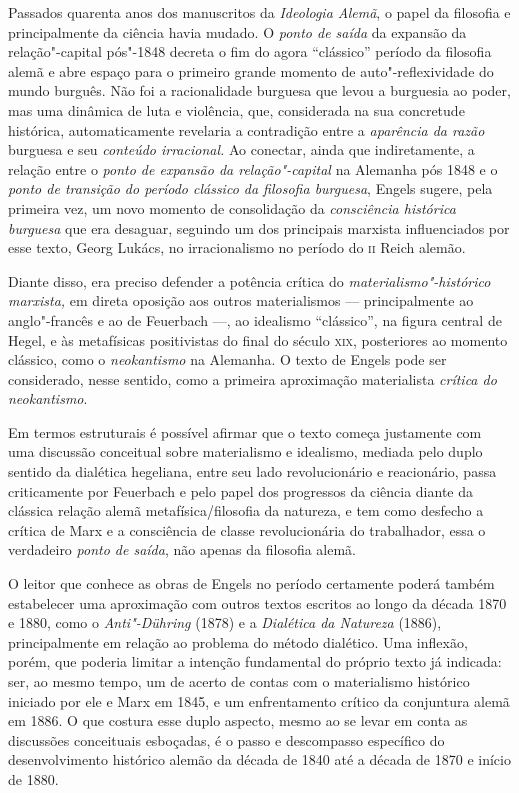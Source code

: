 Passados quarenta anos dos manuscritos da \emph{Ideologia Alemã}, o
papel da filosofia e principalmente da ciência havia mudado. O
\emph{ponto de saída} da expansão da relação"-capital pós"-1848 decreta o
fim do agora ``clássico'' período da filosofia alemã e abre espaço para
o primeiro grande momento de auto"-reflexividade do mundo burguês. Não
foi a racionalidade burguesa que levou a burguesia ao poder, mas uma
dinâmica de luta e violência, que, considerada na sua concretude
histórica, automaticamente revelaria a contradição entre a
\emph{aparência da razão} burguesa e seu \emph{conteúdo irracional.} Ao
conectar, ainda que indiretamente, a relação entre o \emph{ponto de
expansão da relação"-capital} na Alemanha pós 1848 e o \emph{ponto de
transição do período clássico da filosofia burguesa}, Engels sugere,
pela primeira vez, um novo momento de consolidação da \emph{consciência
histórica burguesa} que era desaguar, seguindo um dos principais
marxista influenciados por esse texto, Georg Lukács, no irracionalismo
no período do \textsc{ii} Reich alemão.

Diante disso, era preciso defender a potência crítica do
\emph{materialismo"-histórico marxista,} em direta oposição aos outros
materialismos --- principalmente ao anglo"-francês e ao de Feuerbach ---, ao
idealismo ``clássico'', na figura central de Hegel, e às metafísicas
positivistas do final do século \textsc{xix}, posteriores ao momento clássico,
como o \emph{neokantismo} na Alemanha. O texto de Engels pode ser
considerado, nesse sentido, como a primeira aproximação materialista
\emph{crítica do neokantismo}.

Em termos estruturais é possível afirmar que o texto começa justamente
com uma discussão conceitual sobre materialismo e idealismo, mediada
pelo duplo sentido da dialética hegeliana, entre seu lado revolucionário
e reacionário, passa criticamente por Feuerbach e pelo papel dos
progressos da ciência diante da clássica relação alemã
metafísica/filosofia da natureza, e tem como desfecho a crítica de Marx
e a consciência de classe revolucionária do trabalhador, essa o
verdadeiro \emph{ponto de saída}, não apenas da filosofia alemã.

O leitor que conhece as obras de Engels no período certamente poderá
também estabelecer uma aproximação com outros textos escritos ao longo
da década 1870 e 1880, como o \emph{Anti"-Dühring} (1878) e a
\emph{Dialética da Natureza} (1886), principalmente em relação ao
problema do método dialético. Uma inflexão, porém, que poderia limitar a
intenção fundamental do próprio texto já indicada: ser, ao mesmo tempo,
um de acerto de contas com o materialismo histórico iniciado por ele e
Marx em 1845, e um enfrentamento crítico da conjuntura alemã em 1886. O
que costura esse duplo aspecto, mesmo ao se levar em conta as discussões
conceituais esboçadas, é o passo e descompasso específico do
desenvolvimento histórico alemão da década de 1840 até a década de 1870
e início de 1880.

